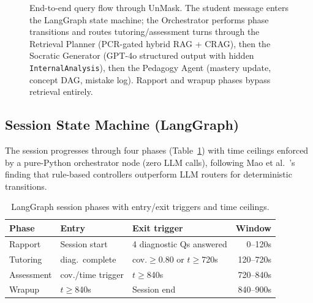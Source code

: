 \documentclass[11pt]{article}
\begin{document}
\begin{figure}[t]
\caption{End-to-end query flow through UnMask. The student message enters the LangGraph state machine; the Orchestrator performs phase transitions and routes tutoring/assessment turns through the Retrieval Planner (PCR-gated hybrid RAG + CRAG), then the Socratic Generator (GPT-4o structured output with hidden \texttt{InternalAnalysis}), then the Pedagogy Agent (mastery update, concept DAG, mistake log). Rapport and wrapup phases bypass retrieval entirely.}
\label{fig:architecture}
\end{figure}

\subsection{Session State Machine (LangGraph)}

The session progresses through four phases (Table~\ref{tab:phases}) with time
ceilings enforced by a pure-Python orchestrator node (zero LLM calls),
following Mao et al.\ \cite{diaggpt2023}'s finding that rule-based controllers outperform
LLM routers for deterministic transitions.

\begin{table}[h]
\centering
\small
\begin{tabularx}{\columnwidth}{@{}l l X r@{}}
\toprule
\textbf{Phase} & \textbf{Entry} & \textbf{Exit trigger} & \textbf{Window} \\
\midrule
Rapport    & Session start     & 4 diagnostic Qs answered       & 0--120s   \\
Tutoring   & diag.\ complete   & cov.$\geq$0.80 or $t\geq$720s  & 120--720s \\
Assessment & cov./time trigger & $t\geq$840s                    & 720--840s \\
Wrapup     & $t\geq$840s       & Session end                    & 840--900s \\
\bottomrule
\end{tabularx}
\caption{LangGraph session phases with entry/exit triggers and time ceilings.}
\label{tab:phases}
\end{table}
\end{document}
